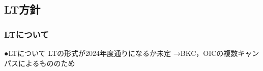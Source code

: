\subsection*{LT方針}


\subsubsection*{LTについて}
●LTについて
 LTの形式が2024年度通りになるか未定
  →BKC，OICの複数キャンパスによるもののため

